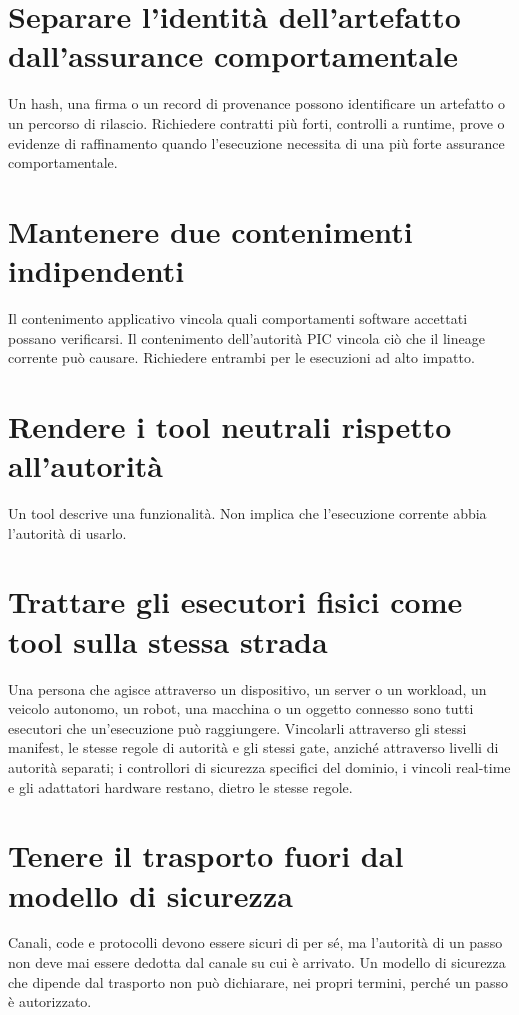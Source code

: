 \documentclass[10pt,oneside,openany]{book}
\begin{document}
\section{Separare l'identità dell'artefatto dall'assurance comportamentale}
Un hash, una firma o un record di provenance possono identificare un artefatto o un percorso di rilascio. Richiedere contratti più forti, controlli a runtime, prove o evidenze di raffinamento quando l'esecuzione necessita di una più forte assurance comportamentale.

\section{Mantenere due contenimenti indipendenti}
Il contenimento applicativo vincola quali comportamenti software accettati possano verificarsi. Il contenimento dell'autorità PIC vincola ciò che il lineage corrente può causare. Richiedere entrambi per le esecuzioni ad alto impatto.

\section{Rendere i tool neutrali rispetto all'autorità}
Un tool descrive una funzionalità. Non implica che l'esecuzione corrente abbia l'autorità di usarlo.

\section{Trattare gli esecutori fisici come tool sulla stessa strada}
Una persona che agisce attraverso un dispositivo, un server o un workload, un veicolo autonomo, un robot, una macchina o un oggetto connesso sono tutti esecutori che un'esecuzione può raggiungere. Vincolarli attraverso gli stessi manifest, le stesse regole di autorità e gli stessi gate, anziché attraverso livelli di autorità separati; i controllori di sicurezza specifici del dominio, i vincoli real-time e gli adattatori hardware restano, dietro le stesse regole.

\section{Tenere il trasporto fuori dal modello di sicurezza}
Canali, code e protocolli devono essere sicuri di per sé, ma l'autorità di un passo non deve mai essere dedotta dal canale su cui è arrivato. Un modello di sicurezza che dipende dal trasporto non può dichiarare, nei propri termini, perché un passo è autorizzato.
\end{document}
